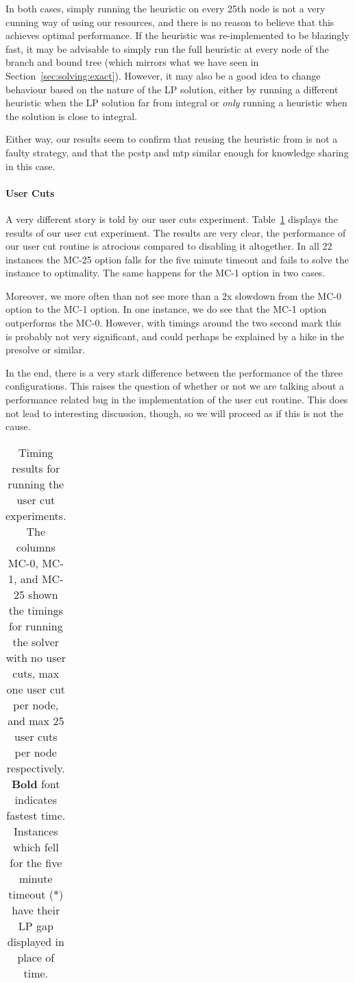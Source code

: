 In both cases, simply running the heuristic on every 25th node is not a very cunning
way of using our resources, and there is no reason to believe that this achieves optimal
performance.
If the heuristic was re-implemented to be blazingly fast, it may be advisable to
simply run the full heuristic at every node of the branch and bound tree
(which mirrors what we have seen in Section~\ref{sec:solving:exact}). However, it may also
be a good idea to change behaviour based on the nature of the LP solution, either by
running a different heuristic when the LP solution far from integral or \textit{only}
running a heuristic when the solution is close to integral.

Either way, our results seem to confirm that reusing the heuristic from
\citeauthor{ljubic2005solving} is not a faulty strategy, and that the \gls{pcstp}
and \gls{mtp} similar enough for knowledge sharing in this case.

\paragraph{User Cuts}
A very different story is told by our user cuts experiment. Table~\ref{tab:jmp:maxcut}
displays the results of our user cut experiment. The results are very clear, the performance
of our user cut routine is atrocious compared to disabling it altogether. In all 22 instances
the MC-25 option falls for the five minute timeout and fails to solve the instance to optimality.
The same happens for the MC-1 option in two cases.

Moreover, we more often than not see more than a 2x slowdown from the MC-0 option to the
MC-1 option. In one instance, we do see that the MC-1 option outperforms the MC-0.
However, with
timings around the two second mark this is probably not very significant, and could
perhaps be explained by a hike in the presolve or similar.
\medskip

In the end, there is a very stark difference between the performance
 of the three configurations.
This raises the question of whether or not we are talking about a performance
related bug in the implementation of the user cut routine. This does not lead to
interesting discussion, though, so we will proceed as if this is not the cause.

\begin{table}[h!]
  \centering
  \begin{tabular}[h!]{|c|c|c|c|c|}\hline
    
  \end{tabular}
  \caption{Timing results for running the user cut experiments. The columns MC-0,
    MC-1, and MC-25 shown the timings for running the solver with no user cuts, max
    one user cut per node, and max 25 user cuts per node respectively.
    \textbf{Bold} font indicates fastest time. Instances which fell for the five minute
  timeout ($*$) have their LP gap displayed in place of time.}\label{tab:jmp:maxcut}
\end{table}

